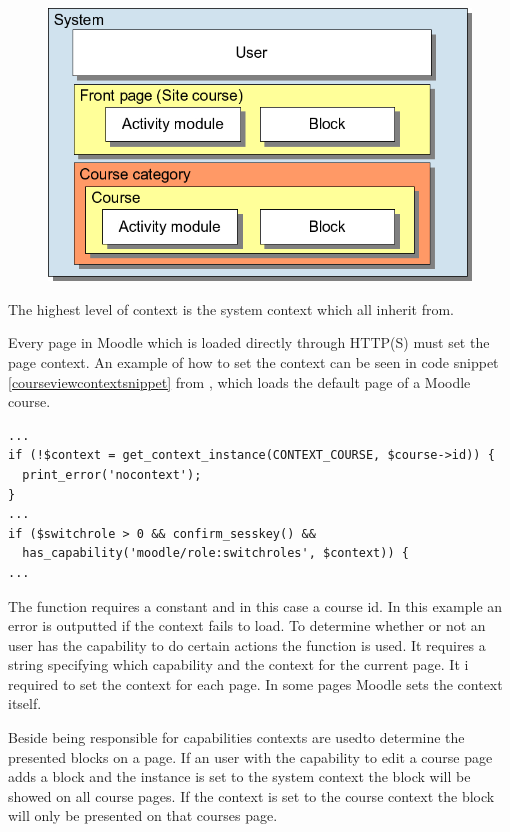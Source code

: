  \begin{figure}
	 \centering
		 \includegraphics[width=\textwidth]{images/moodle-contexts.png}
	 \label{fig:moodle-contexts}
 \end{figure}

The highest level of context is the system context which all inherit from. 

Every page in Moodle which is loaded directly through HTTP(S) must set the page context. 
An example of how to set the context can be seen in code snippet \ref{courseviewcontextsnippet} from , which loads the default page of a Moodle course.

\begin{lstlisting}[style=phpCode, caption=\myCaption{A snippet from \moodlefile{/course/view.php}}, label=courseviewcontextsnippet]
...
if (!$context = get_context_instance(CONTEXT_COURSE, $course->id)) {
  print_error('nocontext');
}
...
if ($switchrole > 0 && confirm_sesskey() &&
  has_capability('moodle/role:switchroles', $context)) {
...	
\end{lstlisting}
The function  requires a constant and in this case a course id. 
In this example an error is outputted if the context fails to load. 
To determine whether or not an user has the capability to do certain actions the function  is used. It requires a string specifying which capability and the context for the current page. 
It i required to set the context for each page. 
In some pages Moodle sets the context itself. 

Beside being responsible for capabilities contexts are usedto determine the presented blocks on a page. If an user with the capability to edit a course page adds a block and the instance is set to the system context the block will be showed on all course pages. If the context is set to the course context the block will only be presented on that courses page. 

	
	
	